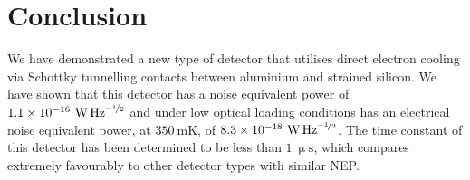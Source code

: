 \documentclass[aip, apl, a4paper, amsmath,amssymb, reprint]{revtex4-1}
\begin{document}
\section{Conclusion}\label{sec:conclusion}
We have demonstrated a new type of detector that utilises direct electron cooling via Schottky tunnelling contacts between aluminium and strained silicon. We have shown that this detector has a noise equivalent power of $1.1 \times 10^{-16}~\mathrm{\mbox{W\,Hz}^{\nicefrac{-1}{2}}}$ and under low optical loading conditions has an electrical noise equivalent power, at $350~\mathrm{mK}$, of $8.3 \times 10^{-18}~\mathrm{\mbox{W\,Hz}^{\nicefrac{-1}{2}}}$. The time constant of this detector has been determined to be less than $1~\mathrm{\upmu s}$, which compares extremely favourably to other detector types with similar NEP.


\end{document}
